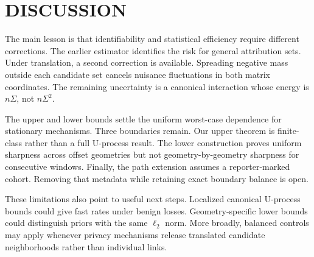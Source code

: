 \documentclass[twoside]{article}
\newcommand{\1}{\mathbf 1}
\begin{document}
\section{DISCUSSION}

The main lesson is that identifiability and statistical efficiency require different corrections. The earlier estimator identifies the risk for general attribution sets. Under translation, a second correction is available. Spreading negative mass outside each candidate set cancels nuisance fluctuations in both matrix coordinates. The remaining uncertainty is a canonical interaction whose energy is $n\Sigma$, not $n\Sigma^2$.

The upper and lower bounds settle the uniform worst-case dependence for stationary mechanisms. Three boundaries remain. Our upper theorem is finite-class rather than a full U-process result. The lower construction proves uniform sharpness across offset geometries but not geometry-by-geometry sharpness for consecutive windows. Finally, the path extension assumes a reporter-marked cohort. Removing that metadata while retaining exact boundary balance is open.

These limitations also point to useful next steps. Localized canonical U-process bounds could give fast rates under benign losses. Geometry-specific lower bounds could distinguish priors with the same $\ell_2$ norm. More broadly, balanced controls may apply whenever privacy mechanisms release translated candidate neighborhoods rather than individual links.



\clearpage
\end{document}
